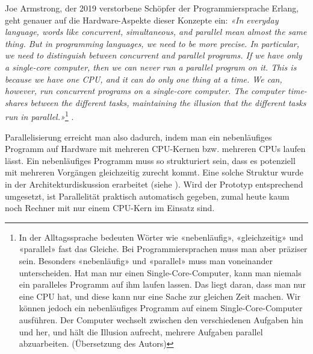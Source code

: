 Joe Armstrong, der 2019 verstorbene Schöpfer der Programmiersprache Erlang, geht genauer auf die Hardware-Aspekte dieser Konzepte ein: \textit{«In everyday language, words like concurrent, simultaneous, and parallel mean almost the same thing. But in programming languages, we need to be more precise. In particular, we need to distinguish between concurrent and parallel programs. If we have only a single-core computer, then we can never run a parallel program on it. This is because we have one CPU, and it can do only one thing at a time. We can, however, run concurrent programs on a single-core computer. The computer time-shares between the different tasks, maintaining the illusion that the different tasks run in parallel.»}\footnote{In der Alltagssprache bedeuten Wörter wie «nebenläufig», «gleichzeitig» und «parallel» fast das Gleiche. Bei Programmiersprachen muss man aber präziser sein. Besonders «nebenläufig» und «parallel» muss man voneinander unterscheiden. Hat man nur einen Single-Core-Computer, kann man niemals ein paralleles Programm auf ihm laufen lassen. Das liegt daran, dass man nur eine CPU hat, und diese kann nur eine Sache zur gleichen Zeit machen. Wir können jedoch ein nebenläufiges Programm auf einem Single-Core-Computer ausführen. Der Computer wechselt zwischen den verschiedenen Aufgaben hin und her, und hält die Illusion aufrecht, mehrere Aufgaben parallel abzuarbeiten. (Übersetzung des Autors)} \cite[S. 8]{programming-erlang}.

Parallelisierung erreicht man also dadurch, indem man ein nebenläufiges Programm auf Hardware mit mehreren CPU-Kernen bzw. mehreren CPUs laufen lässt. Ein nebenläufiges Programm muss so strukturiert sein, dass es potenziell mit mehreren Vorgängen gleichzeitig zurecht kommt. Eine solche Struktur wurde in der Architekturdiskussion erarbeitet (siehe ). Wird der Prototyp entsprechend umgesetzt, ist Parallelität praktisch automatisch gegeben, zumal heute kaum noch Rechner mit nur einem CPU-Kern im Einsatz sind.

\clearpage
